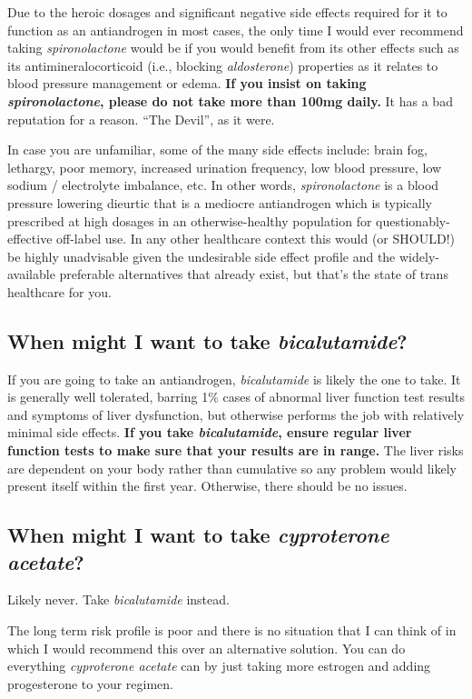 \documentclass{article}
\begin{document}
Due to the heroic dosages and significant negative side effects required for it to function as an antiandrogen in most cases, the only time I would ever recommend taking \textit{spironolactone} would be if you would benefit from its other effects such as its antimineralocorticoid (i.e., blocking \textit{aldosterone}) properties as it relates to blood pressure management or edema. \textbf{If you insist on taking \textit{spironolactone}, please do not take more than 100mg daily.} It has a bad reputation for a reason. “The Devil”, as it were.

In case you are unfamiliar, some of the many side effects include: brain fog, lethargy, poor memory, increased urination frequency, low blood pressure, low sodium / electrolyte imbalance, etc. In other words, \textit{spironolactone} is a blood pressure lowering dieurtic that is a mediocre antiandrogen which is typically prescribed at high dosages in an otherwise-healthy population for questionably-effective off-label use. In any other healthcare context this would (or SHOULD!) be highly unadvisable given the undesirable side effect profile and the widely-available preferable alternatives that already exist, but that's the state of trans healthcare for you.

\subsection{When might I want to take \textit{bicalutamide}?}

If you are going to take an antiandrogen, \textit{bicalutamide} is likely the one to take. It is generally well tolerated, barring 1\% cases of abnormal liver function test results and symptoms of liver dysfunction, but otherwise performs the job with relatively minimal side effects. \textbf{If you take \textit{bicalutamide}, ensure regular liver function tests to make sure that your results are in range. }The liver risks are dependent on your body rather than cumulative so any problem would likely present itself within the first year. Otherwise, there should be no issues. 

\subsection{When might I want to take \textit{cyproterone acetate}?}

Likely never. Take \textit{bicalutamide} instead.

The long term risk profile is poor and there is no situation that I can think of in which I would recommend this over an alternative solution. You can do everything \textit{cyproterone acetate} can by just taking more estrogen and adding progesterone to your regimen.
\end{document}
